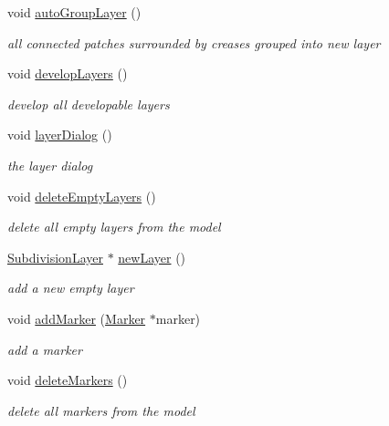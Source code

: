 \begin{DoxyCompactItemize}
void \hyperlink{classShipCAD_1_1Controller_a72c34ce03882c0bb27603cb69af988a6}{auto\-Group\-Layer} ()
\begin{DoxyCompactList}\small\item\em all connected patches surrounded by creases grouped into new layer \end{DoxyCompactList}\item 
void \hyperlink{classShipCAD_1_1Controller_a3e7966e9726ba79f9978e691ce096964}{develop\-Layers} ()
\begin{DoxyCompactList}\small\item\em develop all developable layers \end{DoxyCompactList}\item 
void \hyperlink{classShipCAD_1_1Controller_a9d0f1f9811e86e401d145147361d5ac4}{layer\-Dialog} ()
\begin{DoxyCompactList}\small\item\em the layer dialog \end{DoxyCompactList}\item 
void \hyperlink{classShipCAD_1_1Controller_a2b966f1434e1df01e0bfd589cdb7425d}{delete\-Empty\-Layers} ()
\begin{DoxyCompactList}\small\item\em delete all empty layers from the model \end{DoxyCompactList}\item 
\hyperlink{classShipCAD_1_1SubdivisionLayer}{Subdivision\-Layer} $\ast$ \hyperlink{classShipCAD_1_1Controller_afe6e433ecde6d13e02f409e56b6d258b}{new\-Layer} ()
\begin{DoxyCompactList}\small\item\em add a new empty layer \end{DoxyCompactList}\item 
void \hyperlink{classShipCAD_1_1Controller_aca1410f5433767680bfe16426b32cbc0}{add\-Marker} (\hyperlink{classShipCAD_1_1Marker}{Marker} $\ast$marker)
\begin{DoxyCompactList}\small\item\em add a marker \end{DoxyCompactList}\item 
void \hyperlink{classShipCAD_1_1Controller_ae9cce4c133abd067d98812eb342663d0}{delete\-Markers} ()
\begin{DoxyCompactList}\small\item\em delete all markers from the model \end{DoxyCompactList}\item 

\end{DoxyCompactItemize}
